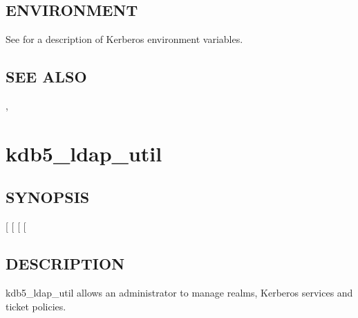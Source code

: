 \documentclass[letterpaper,10pt,english]{sphinxmanual}
\begin{document}
\subsection{ENVIRONMENT}
\label{\detokenize{admin/admin_commands/kdb5_util:environment}}
\sphinxAtStartPar
See  for a description of Kerberos environment
variables.


\subsection{SEE ALSO}
\label{\detokenize{admin/admin_commands/kdb5_util:see-also}}
\sphinxAtStartPar
{\hyperref[\detokenize{admin/admin_commands/kadmin_local:kadmin-1}]{}}, 

\sphinxstepscope


\section{kdb5\_ldap\_util}
\label{\detokenize{admin/admin_commands/kdb5_ldap_util:kdb5-ldap-util}}\label{\detokenize{admin/admin_commands/kdb5_ldap_util:kdb5-ldap-util-8}}\label{\detokenize{admin/admin_commands/kdb5_ldap_util::doc}}

\subsection{SYNOPSIS}
\label{\detokenize{admin/admin_commands/kdb5_ldap_util:synopsis}}\label{\detokenize{admin/admin_commands/kdb5_ldap_util:kdb5-ldap-util-synopsis}}
\sphinxAtStartPar
{}
{[}  {[} \sphinxstyleemphasis{passwd}{]}{]}
{[} \sphinxstyleemphasis{ldapuri}{]}
{[}\sphinxstyleemphasis{command\_options}{]}


\subsection{DESCRIPTION}
\label{\detokenize{admin/admin_commands/kdb5_ldap_util:description}}\label{\detokenize{admin/admin_commands/kdb5_ldap_util:kdb5-ldap-util-synopsis-end}}
\sphinxAtStartPar
kdb5\_ldap\_util allows an administrator to manage realms, Kerberos
services and ticket policies.
\end{document}
